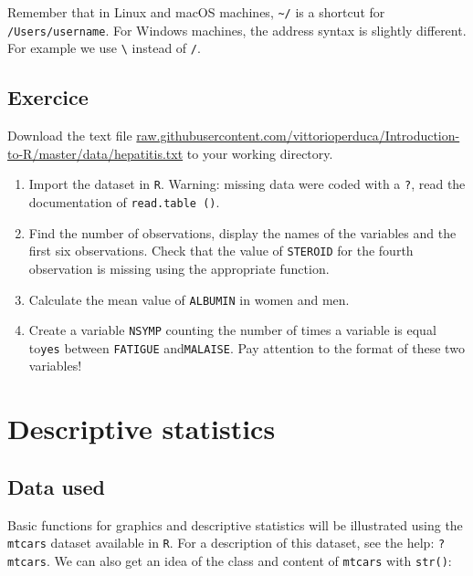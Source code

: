 \documentclass[]{book}
\providecommand{\tightlist}{%
  \setlength{\itemsep}{0pt}\setlength{\parskip}{0pt}}
\begin{document}
Remember that in Linux and macOS machines, \texttt{\textasciitilde{}/} is a shortcut for \texttt{/Users/username}. For Windows machines, the address syntax is slightly different. For example we use \texttt{\textbackslash{}} instead of \texttt{/}.

\hypertarget{exercice}{%
\section{Exercice}\label{exercice}}

Download the text file \href{https://raw.githubusercontent.com/vittorioperduca/Introduction-to-R/master/data/hepatitis.txt}{raw.githubusercontent.com/vittorioperduca/Introduction-to-R/master/data/hepatitis.txt} to your working directory.

\begin{enumerate}
\def\labelenumi{\arabic{enumi}.}
\tightlist
\item
  Import the dataset in \texttt{R}. Warning: missing data were coded with a \texttt{?}, read the documentation of \texttt{read.table\ ()}.
\item
  Find the number of observations, display the names of the variables and the first six observations. Check that the value of \texttt{STEROID} for the fourth observation is missing using the appropriate function.
\item
  Calculate the mean value of \texttt{ALBUMIN} in women and men.
\item
  Create a variable \texttt{NSYMP} counting the number of times a variable is equal to\texttt{yes} between \texttt{FATIGUE} and\texttt{MALAISE}. Pay attention to the format of these two variables!
\end{enumerate}

\hypertarget{descriptive-statistics}{%
\chapter{Descriptive statistics}\label{descriptive-statistics}}

\hypertarget{data-used}{%
\section{Data used}\label{data-used}}

Basic functions for graphics and descriptive statistics will be illustrated using the \texttt{mtcars} dataset available in \texttt{R}. For a description of this dataset, see the help: \texttt{?mtcars}. We can also get an idea of the class and content of \texttt{mtcars} with \texttt{str()}:
\end{document}
